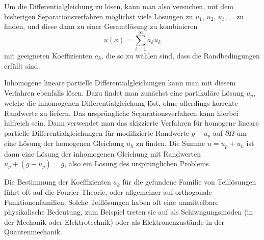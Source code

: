 Um die Differentialgleichung zu lösen, kann man also versuchen, mit
dem bisherigen Separationsverfahren möglichst viele Lösungen zu
$u_1$, $u_2$, $u_3,\dots$ zu finden, und diese dann zu einer Gesamtlösung
zu kombinieren
\[
u(x)=\sum_{i=1}^\infty a_ku_k
\]
mit geeigneten Koeffizienten $a_k$, die so zu wählen sind, dass die
Randbedingungen erfüllt sind.

Inhomogene lineare partielle Differentialgleichungen kann man mit diesem
Verfahren ebenfalls lösen. Dazu findet man zunächst eine partikuläre
Lösung $u_p$, welche die inhomogenen Differentialgleichung löst, ohne
allerdings korrekte Randwerte zu liefern.
Das ursprüngliche Separationsverfahren kann hierbei hilfreich sein.
Dann verwendet man das skizzierte Verfahren für homogene lineare
partielle Differentialgleichungen für modifizierte Randwerte $g-u_p$ auf
$\partial\Omega$ um eine Lösung der homogenen Gleichung $u_h$ zu finden.
Die Summe $u=u_p+u_h$ ist dann eine Lösung der inhomogenen Gleichung
mit Randwerten $u_p + (g-u_p)=g$, also ein Lösung des ursprünglichen
Problems.

Die Bestimmung der Koeffizienten $a_k$ für die gefundene Familie
von Teillösungen führt oft auf die Fourier-Theorie, oder allgemeiner
auf orthogonale Funktionenfamilien. Solche Teillösungen haben oft eine
unmittelbare physikalische Bedeutung, zum Beispiel treten sie auf als
Schiwngungsmoden (in der Mechanik oder Elektrotechnik) oder als
Elektronenzustände in der Quantenmechanik.

